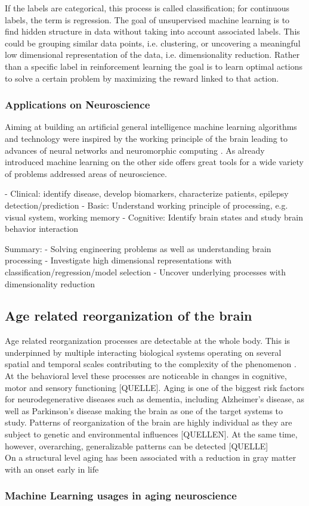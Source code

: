 If the labels are categorical, this process is called classification; for continuous labels, the term is regression. The goal of unsupervised machine learning is to find hidden structure in data without taking into account associated labels. This could be grouping similar data points, i.e. clustering, or uncovering a meaningful low dimensional representation of the data, i.e. dimensionality reduction. Rather than a specific label in reinforcement learning the goal is to learn optimal actions to solve a certain problem by maximizing the reward linked to that action.

\subsubsection{Applications on Neuroscience}
Aiming at building an artificial general intelligence machine learning algorithms and technology were inspired by the working principle of the brain leading to advances of neural networks \cite{Macpherson2021} and neuromorphic computing \cite{Choi2022}. As already introduced machine learning on the other side offers great tools for a wide variety of problems addressed areas of neuroscience. 

- Clinical: identify disease, develop biomarkers, characterize patients, epilepsy detection/prediction
- Basic: Understand working principle of processing, e.g. visual system, working memory
- Cognitive: Identify brain states and study brain behavior interaction

Summary: 
- Solving engineering problems as well as understanding brain processing 
- Investigate high dimensional representations with classification/regression/model selection 
- Uncover underlying processes with dimensionality reduction


\subsection{Age related reorganization of the brain}
\label{subsec:Aging}

Age related reorganization processes are detectable at the whole body. This is underpinned by multiple interacting biological systems operating on several spatial and temporal scales contributing to the complexity of the phenomenon \cite{Mooney2016}. At the behavioral level these processes are noticeable in changes in cognitive, motor and sensory functioning [QUELLE]. Aging is one of the biggest risk factors for neurodegenerative diseases such as dementia, including Alzheimer's disease, as well as Parkinson's disease making the brain as one of the target systems to study. Patterns of reorganization of the brain are highly individual as they are subject to genetic and environmental influences [QUELLEN]. At the same time, however, overarching, generalizable patterns can be detected [QUELLE]\\
On a structural level aging has been associated with a reduction in gray matter with an onset early in life 

\subsubsection{Machine Learning usages in aging neuroscience}
